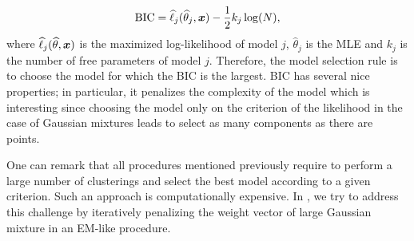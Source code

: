\begin{equation}
  \textnormal{BIC} = \widehat\ell_j(\widehat\theta_j,\boldsymbol x)-\frac{1}{2}k_j\log(N),
\end{equation}
where $\widehat\ell_j(\widehat\theta,\boldsymbol x)$ is the maximized log-likelihood of model $j$, $\hat\theta_j$ is the MLE and $k_j$ is the number of free parameters of model $j$. Therefore, the model selection rule is to choose the model for which the BIC is the largest. BIC has several nice properties; in particular, it penalizes the complexity of the model which is interesting since choosing the model only on the criterion of the{} likelihood in the case of Gaussian mixtures leads to select as many components as there are points. 

One can remark that all procedures mentioned previously require to perform a large number of clusterings and select the best model according to a given criterion. Such an approach is computationally expensive. In , we try to address this challenge by iteratively penalizing the weight vector of large Gaussian mixture in an EM-like procedure.

